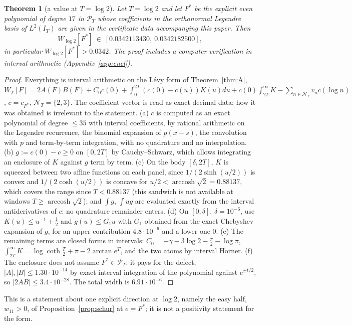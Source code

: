 \documentclass[11pt]{amsart}
\newtheorem{theorem}{Theorem}[section]
\theoremstyle{definition}
\theoremstyle{remark}
\newcommand{\PT}{\mathcal P_T}
\newcommand{\IT}{I_T}
\newcommand{\NT}{\mathcal N_T}
\begin{document}
\begin{theorem}[a value at $T=\log2$]\label{thm:w11}
Let $T=\log2$ and let $F^*$ be the explicit even polynomial of degree $17$ in $\PT$ whose coefficients
in the orthonormal Legendre basis of $L^2(\IT)$ are given in the certificate data accompanying this
paper. Then
\[
W_{\log2}[F^*]\ \in\ [0.0342113430,\ 0.0342182500],
\]
in particular $W_{\log2}[F^*]>0.0342$. The proof includes a computer verification in interval arithmetic
(Appendix~\ref{app:encl}).
\end{theorem}
\begin{proof}
Everything is interval arithmetic on the L\'evy form of Theorem~\ref{thm:A},
$W_T[F]=2A(F)B(F)+C_0c(0)+\int_0^{2T}(c(0)-c(u))K(u)du+c(0)\int_{2T}^\infty K-\sum_{n\in\NT}v_nc(\log n)$,
$c=c_{F^*}$, $\NT=\{2,3\}$. The coefficient vector is read as exact decimal data; how it was
obtained is irrelevant to the statement. (a) $c$ is computed as an exact polynomial of degree
$\le35$ with interval coefficients, by rational arithmetic on the Legendre recurrence, the binomial
expansion of $p(x-s)$, the convolution with $p$ and term-by-term integration, with no quadrature and no
interpolation. (b) $g:=c(0)-c\ge0$ on $[0,2T]$ by Cauchy--Schwarz, which allows integrating an
enclosure of $K$ against $g$ term by term. (c) On the body $[\delta,2T]$, $K$ is squeezed between two
affine functions on each panel, since $1/(2\sinh(u/2))$ is convex and $1/(2\cosh(u/2))$ is concave for
$u/2<\operatorname{arccosh}\sqrt2=0.88137$, which covers the range since $T<0.88137$ (this sandwich is not
available at windows $T\ge\operatorname{arccosh}\sqrt2$); and
$\int g$, $\int ug$ are evaluated exactly from the interval antiderivatives of $c$: no quadrature
remainder enters. (d) On $[0,\delta]$, $\delta=10^{-6}$, use $K(u)\le u^{-1}+\frac12$ and
$g(u)\le G_1u$ with $G_1$ obtained from the exact Chebyshev expansion of $g$, for an upper
contribution $4.8\cdot10^{-6}$ and a lower one $0$. (e) The remaining terms are closed forms in
intervals: $C_0=-\gamma-3\log2-\frac\pi2-\log\pi$, $\int_{2T}^\infty K=\log\coth\frac T2+\pi-2\arctan e^{T}$,
and the two atoms by interval Horner. (f) The enclosure does not assume $F^*\in\PT$: it pays for the
defect, $|A|,|B|\le1.30\cdot10^{-14}$ by exact interval integration of the polynomial against
$e^{\pm t/2}$, so $|2AB|\le3.4\cdot10^{-28}$. The total width is $6.91\cdot10^{-6}$.
\end{proof}

This is a statement about one explicit direction at $\log2$, namely the easy half, $w_{11}>0$, of
Proposition~\ref{prop:schur} at $e=F^*$; it is not a positivity statement for the form.
\end{document}
